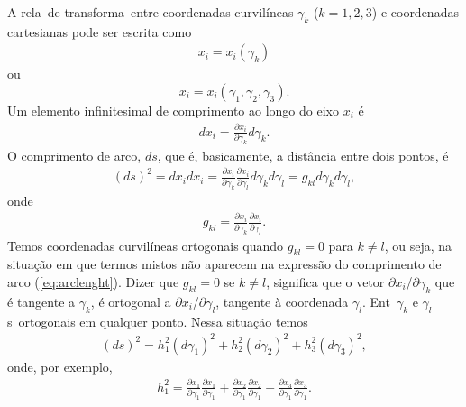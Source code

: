 A rela\cao\ de transforma\cao\ entre coordenadas curvil\'ineas
$\gamma_{k}$ ($k = 1,2,3$) e coordenadas cartesianas pode ser
escrita como
\begin{eqnarray}
x_{i} = x_{i}(\gamma_{k})
\end{eqnarray}
ou
\begin{equation}
x_{i} = x_{i}(\gamma_{1}, \gamma_{2}, \gamma_{3}).
\end{equation}
Um elemento infinitesimal de comprimento ao longo do eixo $x_{i}$ \'e
\begin{eqnarray}
dx_{i} = \frac{\partial x_{i}}{\partial \gamma_{k}}d\gamma_{k}.
\end{eqnarray}
O comprimento de arco, $ds$, que \'e, basicamente, a dist\^ancia entre
dois pontos, \'e
\begin{eqnarray}
(ds)^{2} = dx_{i}dx_{i} = \frac{\partial x_{i}}{\partial
\gamma_{k}}\frac{\partial x_{i}}{\partial
\gamma_{l}}d\gamma_{k}d\gamma_{l} = g_{kl}d\gamma_{k}d\gamma_{l},
\label{eq:arclenght}
\end{eqnarray}
onde
\begin{eqnarray}
g_{kl} = \frac{\partial x_{i}}{\partial \gamma_{k}}\frac{\partial
x_{i}}{\partial \gamma_{l}}.
\end{eqnarray}
Temos coordenadas curvil\'ineas ortogonais quando $g_{kl} = 0$ para $k \neq l$,
ou seja, na situa\c{c}\~ao em que termos mistos n\~ao aparecem na express\~ao
do comprimento de arco (\ref{eq:arclenght}). Dizer que $g_{kl} = 0$ se $k \neq
l$, significa que
o vetor $\partial x_{i}$/$ \partial \gamma_{k}$ que \'e tangente a
$\gamma_{k}$, \'e ortogonal a $\partial x_{i}$/$\partial
\gamma_{l}$, tangente \`a coordenada $\gamma_{l}$. Ent\ao\
$\gamma_{k}$ e $\gamma_{l}$ s\ao\ ortogonais em qualquer ponto.
Nessa situa\c{c}\~ao temos
\begin{eqnarray}
(ds)^{2} = h_{1}^{2}(d\gamma_{1})^{2} + h_{2}^{2}(d\gamma_{2})^{2}
+ h_{3}^{2}(d\gamma_{3})^{2},
\end{eqnarray}
onde, por exemplo,
\begin{eqnarray}
h_{1}^{2} = \frac{\partial x_{1}}{\partial
\gamma_{1}}\frac{\partial x_{1}}{\partial \gamma_{1}} +
\frac{\partial x_{2}}{\partial \gamma_{1}}\frac{\partial
x_{2}}{\partial \gamma_{1}} + \frac{\partial x_{3}}{\partial
\gamma_{1}}\frac{\partial x_{3}}{\partial \gamma_{1}}.
\end{eqnarray}
